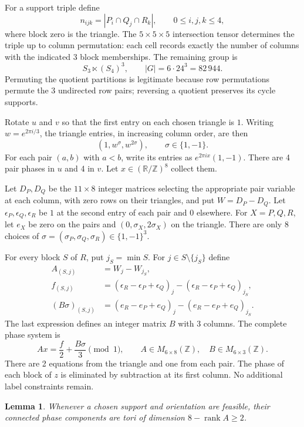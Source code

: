 \documentclass[11pt,a4paper]{article}
\newtheorem{lemma}[theorem]{Lemma}
\theoremstyle{plain}
\theoremstyle{definition}
\theoremstyle{plain}
\begin{document}
For a support triple define
$$n_{ijk}=|P_i\cap Q_j\cap R_k|,\qquad 0\leq i,j,k\leq4,$$
where block zero is the triangle. The $5\times5\times5$ intersection tensor determines the triple up to column permutation: each cell records exactly the number of columns with the indicated 3 block memberships. The remaining group is
$$S_3\ltimes(S_4)^3,\qquad |G|=6\cdot24^3=82\,944.$$
Permuting the quotient partitions is legitimate because row permutations permute the 3 undirected row pairs; reversing a quotient preserves its cycle supports.

\medskip
Rotate $u$ and $v$ so that the first entry on each chosen triangle is $1$. Writing $w=e^{2\pi i/3}$, the triangle entries, in increasing column order, are then
$$(1,w^\sigma,w^{2\sigma}),\qquad \sigma\in\{1,-1\}.$$
For each pair $(a,b)$ with $a<b$, write its entries as $e^{2\pi ix}(1,-1)$. There are 4 pair phases in $u$ and 4 in $v$. Let $x\in(\mathbb R/\mathbb{Z})^8$ collect them.

Let $D_P,D_Q$ be the $11\times8$ integer matrices selecting the appropriate pair variable at each column, with zero rows on their triangles, and put $W=D_P-D_Q$. Let $\epsilon_P,\epsilon_Q,\epsilon_R$ be $1$ at the second entry of each pair and $0$ elsewhere. For $X=P,Q,R$, let $e_X$ be zero on the pairs and $(0,\sigma_X,2\sigma_X)$ on the triangle. There are only 8 choices of $\sigma=(\sigma_P,\sigma_Q,\sigma_R)\in\{1,-1\}^3$.

For every block $S$ of $R$, put $j_S=\min S$. For $j\in S\setminus\{j_S\}$ define
\begin{align*}
A_{(S,j)}&=W_j-W_{j_S},\\
f_{(S,j)}&=(\epsilon_R-\epsilon_P+\epsilon_Q)_j -(\epsilon_R-\epsilon_P+\epsilon_Q)_{j_S},\\
(B\sigma)_{(S,j)}&=(e_R-e_P+e_Q)_j-(e_R-e_P+e_Q)_{j_S}.
\end{align*}
The last expression defines an integer matrix $B$ with 3 columns. The complete phase system is
\[
Ax=\frac f2+\frac{B\sigma}{3}\pmod1, \qquad A\in M_{6\times8}(\mathbb{Z}),\quad B\in M_{6\times3}(\mathbb{Z}).
\]
There are 2 equations from the triangle and one from each pair. The phase of each block of $z$ is eliminated by subtraction at its first column. No additional label constraints remain.

\par\addvspace{\medskipamount}\noindent
\begin{minipage}{\linewidth}
\begin{lemma}\label{n11_noA_FFF:dimension}
Whenever a chosen support and orientation are feasible, their connected phase components are tori of dimension $8-\operatorname{rank}A\geq2$.
\end{lemma}
\end{minipage}
\par\addvspace{\medskipamount}
\end{document}
